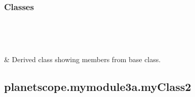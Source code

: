 \documentclass[letterpaper,10pt,english]{sphinxmanual}
\begin{document}
\subsubsection*{Classes}


\begin{savenotes}\sphinxatlongtablestart\begin{longtable}[c]{}
\hline

\endfirsthead

%
{}\\
\hline

\endhead

\hline
{}\\
\endfoot

\endlastfoot

\sphinxAtStartPar
{\hyperref[\detokenize{_autosummary/planetscope.mymodule3a.myClass2:planetscope.mymodule3a.myClass2}]{}}
&
\sphinxAtStartPar
Derived class showing members from base class.
\\
\hline
\end{longtable}\sphinxatlongtableend\end{savenotes}


\subsection{planetscope.mymodule3a.myClass2}
\label{\detokenize{_autosummary/planetscope.mymodule3a.myClass2:planetscope-mymodule3a-myclass2}}\label{\detokenize{_autosummary/planetscope.mymodule3a.myClass2::doc}}
\end{document}
